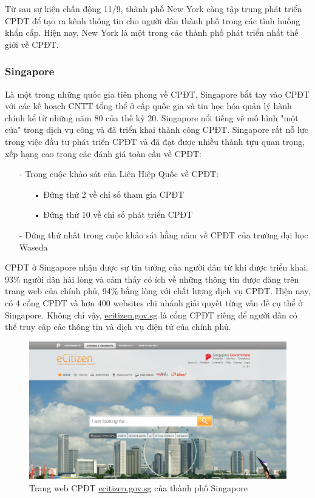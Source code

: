 \documentclass[a4paper]{article}
\begin{document}
Từ sau sự kiện chấn động 11/9, thành phố New York càng tập trung phát triển CPĐT để tạo ra kênh thông tin cho người dân thành phố trong các tình huống khẩn cấp. Hiện nay, New York là một trong các thành phố phát triển nhất thế giới về CPĐT. 

\subsubsection{Singapore}
Là một trong những quốc gia tiên phong về CPĐT, Singapore bắt tay vào CPĐT với các kế hoạch CNTT tổng thể ở cấp quốc gia và tin học hóa quản lý hành chính kể từ những năm 80 của thế kỷ 20. Singapore nổi tiếng về mô hình "một cửa" trong dịch vụ công và đã triển khai thành công CPĐT. Singapore rất nỗ lực trong việc đầu tư phát triển CPĐT và đã đạt được nhiều thành tựu quan trọng, xếp hạng cao trong các đánh giá toàn cầu về CPĐT:
\begin{itemize}
	\item[-]Trong cuộc khảo sát của Liên Hiệp Quốc về CPĐT:
	\begin{itemize}
	\item[•]Đứng thứ 2 về chỉ số tham gia CPĐT
	\item[•]Đứng thứ 10 về chỉ số phát triển CPĐT
	\end{itemize}
	\item[-]Đứng thứ nhất trong cuộc khảo sát hằng năm về CPĐT của trường đại học Waseda
\end{itemize}
CPĐT ở Singapore nhận được sự tin tưởng của người dân từ khi được triển khai. 93\% người dân hài lòng và cảm thấy có ích về những thông tin được đăng trên trang web của chính phủ, 94\% bằng lòng với chất lượng dịch vụ CPĐT.
Hiện nay, có 4 cổng CPĐT và hơn 400 websites chi nhánh giải quyết từng vấn đề cụ thể ở Singapore. Không chỉ vậy, \href{https://www.ecitizen.gov.sg}{ecitizen.gov.sg} là cổng CPĐT riêng để người dân có thể truy cập các thông tin và dịch vụ điện tử của chính phủ.	
\begin{center}
    \begin{figure}[h]
    \begin{center}
     \includegraphics[scale=.3]{singapore.PNG}
    \end{center}
    \caption{Trang web CPĐT \href{ecitizen.gov.sg}{ecitizen.gov.sg} của thành phố Singapore}
    \label{refhinh2}
    \end{figure}
\end{center}
\end{document}
